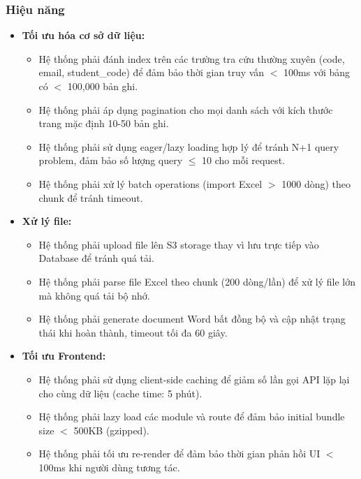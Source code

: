 \subsubsection{Hiệu năng}

\begin{itemize}
    \item \textbf{Tối ưu hóa cơ sở dữ liệu:}
    \begin{itemize}
        \item Hệ thống phải đánh index trên các trường tra cứu thường xuyên (code, email, student\_code) để đảm bảo thời gian truy vấn $<$ 100ms với bảng có $<$ 100,000 bản ghi.
        \item Hệ thống phải áp dụng pagination cho mọi danh sách với kích thước trang mặc định 10-50 bản ghi.
        \item Hệ thống phải sử dụng eager/lazy loading hợp lý để tránh N+1 query problem, đảm bảo số lượng query $\leq$ 10 cho mỗi request.
        \item Hệ thống phải xử lý batch operations (import Excel $>$ 1000 dòng) theo chunk để tránh timeout.
    \end{itemize}
    
    \item \textbf{Xử lý file:}
    \begin{itemize}
        \item Hệ thống phải upload file lên S3 storage thay vì lưu trực tiếp vào Database để tránh quá tải.
        \item Hệ thống phải parse file Excel theo chunk (200 dòng/lần) để xử lý file lớn mà không quá tải bộ nhớ.
        \item Hệ thống phải generate document Word bất đồng bộ và cập nhật trạng thái khi hoàn thành, timeout tối đa 60 giây.
    \end{itemize}
    
    \item \textbf{Tối ưu Frontend:}
    \begin{itemize}
        \item Hệ thống phải sử dụng client-side caching để giảm số lần gọi API lặp lại cho cùng dữ liệu (cache time: 5 phút).
        \item Hệ thống phải lazy load các module và route để đảm bảo initial bundle size $<$ 500KB (gzipped).
        \item Hệ thống phải tối ưu re-render để đảm bảo thời gian phản hồi UI $<$ 100ms khi người dùng tương tác.
    \end{itemize}
\end{itemize}

